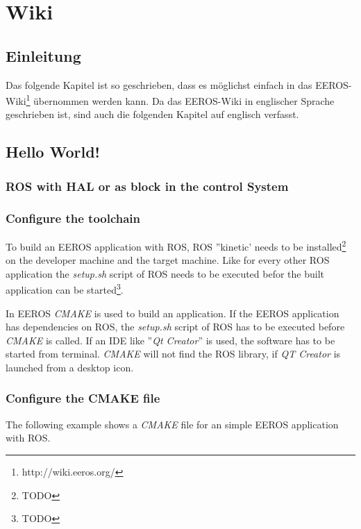 \chapter{Wiki}
\section{Einleitung}
Das folgende Kapitel ist so geschrieben, dass es möglichst einfach in das EEROS-Wiki\footnote{http://wiki.eeros.org/} übernommen werden kann.
Da das EEROS-Wiki in englischer Sprache geschrieben ist, sind auch die folgenden Kapitel auf englisch verfasst.


\section{Hello World!}


\subsection{ROS with HAL or as block in the control System}



\subsection{Configure the toolchain}										%
To build an EEROS application with ROS, ROS ''kinetic' needs to be installed\footnote{TODO} on the developer machine and the target machine.
Like for every other ROS application the \textit{setup.sh} script of ROS needs to be executed befor the built application can be started\footnote{TODO}.%

In EEROS \textit{CMAKE} is used to build an application.
If the EEROS application has dependencies on ROS, the \textit{setup.sh} script of ROS has to be executed before \textit{CMAKE} is called.
If an IDE like ''\textit{Qt Creator}'' is used, the software has to be started from terminal.
\textit{CMAKE} will not find the ROS library, if \textit{QT Creator} is launched from a desktop icon.

\subsection{Configure the CMAKE file}
The following example shows a \textit{CMAKE} file for an simple EEROS application with ROS.

